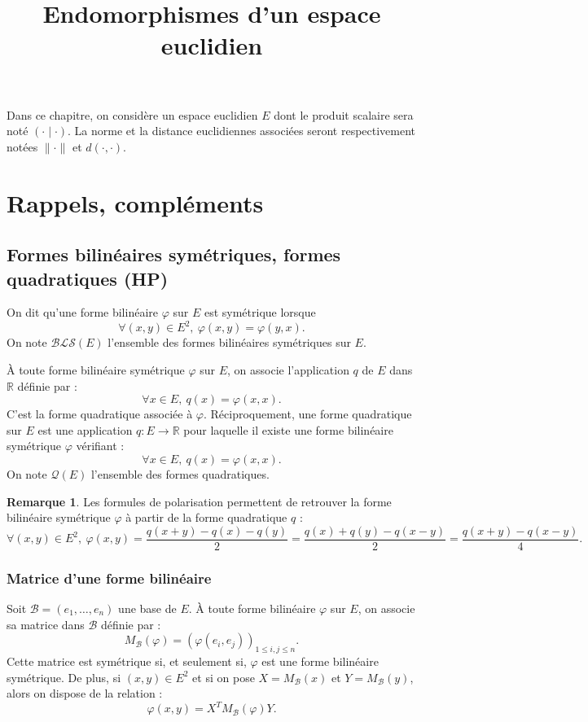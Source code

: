 \documentclass[french]{article}
\title{Endomorphismes d'un espace euclidien}
\date{}
\newcommand{\R}{\mathbb{R}}
\theoremstyle{plain}
\theoremstyle{definition}
\newtheorem*{rmq}{Remarque}
\theoremstyle{remark}
\begin{document}
\tableofcontents

\newpage
\maketitle
Dans ce chapitre, on considère un espace euclidien $E$ dont le produit scalaire sera noté $(\cdot\mid\cdot)$. La norme et la distance euclidiennes associées seront respectivement notées $\lVert\cdot\rVert$ et $d(\cdot,\cdot)$.

\section{Rappels, compléments}

\subsection{Formes bilinéaires symétriques, formes quadratiques (HP)}

\begin{dfn}
	On dit qu'une forme bilinéaire $\varphi$ sur $E$ est symétrique lorsque $$\forall (x,y)\in E^2,\ \varphi(x,y)=\varphi(y,x).$$ On note $\mathcal{BLS}(E)$ l'ensemble des formes bilinéaires symétriques sur $E$.
\end{dfn}

\begin{dfn}
	À toute forme bilinéaire symétrique $\varphi$ sur $E$, on associe l'application $q$ de $E$ dans $\R$ définie par : $$\forall x\in E,\ q(x)=\varphi(x,x).$$ C'est la forme quadratique associée à $\varphi$. Réciproquement, une forme quadratique sur $E$ est une application $q:E\to\R$ pour laquelle il existe une forme bilinéaire symétrique $\varphi$ vérifiant : $$\forall x\in E,\ q(x)=\varphi(x,x).$$ On note $\mathcal{Q}(E)$ l'ensemble des formes quadratiques.
\end{dfn}

\begin{rmq}
	Les formules de polarisation permettent de retrouver la forme bilinéaire symétrique $\varphi$ à partir de la forme quadratique $q$ : $$\forall (x,y)\in E^2,\ \varphi(x,y)=\frac{q(x+y)-q(x)-q(y)}{2}=\frac{q(x)+q(y)-q(x-y)}{2}=\frac{q(x+y)-q(x-y)}{4}.$$
\end{rmq}

\subsubsection*{Matrice d'une forme bilinéaire}
Soit $\mathcal{B}=(e_1,\ldots,e_n)$ une base de $E$. À toute forme bilinéaire $\varphi$ sur $E$, on associe sa matrice dans $\mathcal{B}$ définie par : $$M_\mathcal{B}(\varphi)=\left(\varphi(e_i,e_j)\right)_{1\leqslant i,j\leqslant n}.$$ Cette matrice est symétrique si, et seulement si, $\varphi$ est une forme bilinéaire symétrique. De plus, si $(x,y)\in E^2$ et si on pose $X=M_\mathcal{B}(x)$ et $Y=M_\mathcal{B}(y)$, alors on dispose de la relation : $$\varphi(x,y)=X^TM_\mathcal{B}(\varphi)Y.$$
\end{document}

